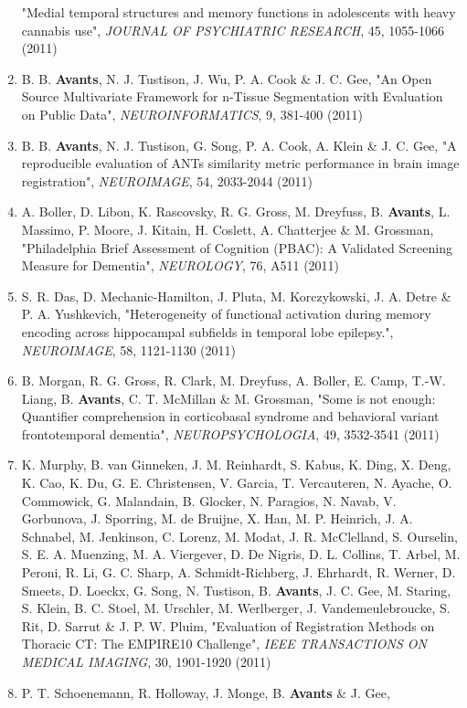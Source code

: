 \documentclass[11pt]{moderncv} %
\begin{document}
\begin{enumerate}
"Medial temporal structures and memory functions in adolescents with heavy cannabis use", 
{\em JOURNAL OF PSYCHIATRIC RESEARCH}, 45, 1055-1066 (2011)
\item B. B. \textbf{Avants}, N. J. Tustison, J. Wu, P. A. Cook \&  J. C. Gee, 
"An Open Source Multivariate Framework for n-Tissue Segmentation with Evaluation on Public Data", 
{\em NEUROINFORMATICS}, 9, 381-400 (2011)
\item B. B. \textbf{Avants}, N. J. Tustison, G. Song, P. A. Cook, A. Klein \&  J. C. Gee, 
"A reproducible evaluation of ANTs similarity metric performance in brain image registration", 
{\em NEUROIMAGE}, 54, 2033-2044 (2011)
\item A. Boller, D. Libon, K. Rascovsky, R. G. Gross, M. Dreyfuss, B. \textbf{Avants}, L. Massimo, P. Moore, J. Kitain, H. Coslett, A. Chatterjee \&  M. Grossman, 
"Philadelphia Brief Assessment of Cognition (PBAC): A Validated Screening Measure for Dementia", 
{\em NEUROLOGY}, 76, A511 (2011)
\item S. R. Das, D. Mechanic-Hamilton, J. Pluta, M. Korczykowski, J. A. Detre \&  P. A. Yushkevich, 
"Heterogeneity of functional activation during memory encoding across hippocampal subfields in temporal lobe epilepsy.", 
{\em NEUROIMAGE}, 58, 1121-1130 (2011)
\item B. Morgan, R. G. Gross, R. Clark, M. Dreyfuss, A. Boller, E. Camp, T.-W. Liang, B. \textbf{Avants}, C. T. McMillan \&  M. Grossman, 
"Some is not enough: Quantifier comprehension in corticobasal syndrome and behavioral variant frontotemporal dementia", 
{\em NEUROPSYCHOLOGIA}, 49, 3532-3541 (2011)
\item K. Murphy, B. van Ginneken, J. M. Reinhardt, S. Kabus, K. Ding, X. Deng, K. Cao, K. Du, G. E. Christensen, V. Garcia, T. Vercauteren, N. Ayache, O. Commowick, G. Malandain, B. Glocker, N. Paragios, N. Navab, V. Gorbunova, J. Sporring, M. de Bruijne, X. Han, M. P. Heinrich, J. A. Schnabel, M. Jenkinson, C. Lorenz, M. Modat, J. R. McClelland, S. Ourselin, S. E. A. Muenzing, M. A. Viergever, D. De Nigris, D. L. Collins, T. Arbel, M. Peroni, R. Li, G. C. Sharp, A. Schmidt-Richberg, J. Ehrhardt, R. Werner, D. Smeets, D. Loeckx, G. Song, N. Tustison, B. \textbf{Avants}, J. C. Gee, M. Staring, S. Klein, B. C. Stoel, M. Urschler, M. Werlberger, J. Vandemeulebroucke, S. Rit, D. Sarrut \&  J. P. W. Pluim, 
"Evaluation of Registration Methods on Thoracic CT: The EMPIRE10 Challenge", 
{\em IEEE TRANSACTIONS ON MEDICAL IMAGING}, 30, 1901-1920 (2011)
\item P. T. Schoenemann, R. Holloway, J. Monge, B. \textbf{Avants} \&  J. Gee, 

\end{enumerate}
\end{document}
